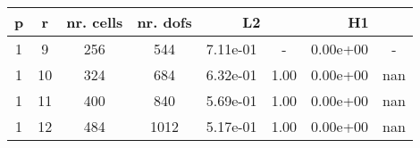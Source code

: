 \documentclass[10pt]{report}
\begin{document}
\begin{table}[H]
\begin{center}
\begin{tabular}{|c|c|c|c|c|c|c|c|} \hline
p & r & nr. cells & nr. dofs & 
\multicolumn{2}{|c|}{L2} & 
\multicolumn{2}{|c|}{H1}\\ \hline
1 & 9 & 256 & 544 & 7.11e-01 & - & 0.00e+00 & -\\ \hline
1 & 10 & 324 & 684 & 6.32e-01 & 1.00 & 0.00e+00 & nan\\ \hline
1 & 11 & 400 & 840 & 5.69e-01 & 1.00 & 0.00e+00 & nan\\ \hline
1 & 12 & 484 & 1012 & 5.17e-01 & 1.00 & 0.00e+00 & nan\\ \hline
\end{tabular}
\end{center}
\end{table}
\end{document}
